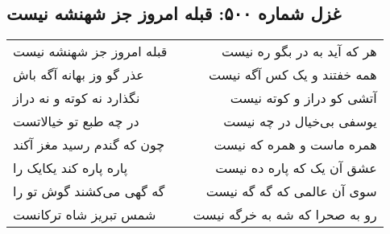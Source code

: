 \begin{center}
\section*{غزل شماره ۵۰۰: قبله امروز جز شهنشه نیست}
\label{sec:0500}
\begin{longtable}{l p{0.5cm} r}
قبله امروز جز شهنشه نیست
&&
هر که آید به در بگو ره نیست
\\
عذر گو وز بهانه آگه باش
&&
همه خفتند و یک کس آگه نیست
\\
نگذارد نه کوته و نه دراز
&&
آتشی کو دراز و کوته نیست
\\
در چه طبع تو خیالاتست
&&
یوسفی بی‌خیال در چه نیست
\\
چون که گندم رسید مغز آکند
&&
همره ماست و همره که نیست
\\
پاره پاره کند یکایک را
&&
عشق آن یک که پاره ده نیست
\\
گه گهی می‌کشند گوش تو را
&&
سوی آن عالمی که گه گه نیست
\\
شمس تبریز شاه ترکانست
&&
رو به صحرا که شه به خرگه نیست
\\
\end{longtable}
\end{center}
